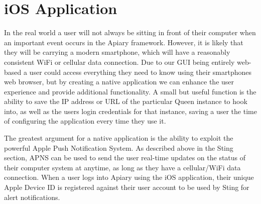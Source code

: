 \section{iOS Application}

In the real world a user will not always be sitting in front of their computer
when an important event occurs in the Apiary framework. However, it is likely
that they will be carrying a modern smartphone, which will have a reasonably
consistent WiFi or cellular data connection. Due to our GUI being entirely
web-based a user could access everything they need to know using their
smartphones web browser, but by creating a native application we can enhance the
user experience and provide additional functionality. A small but useful
function is the ability to save the IP address or URL of the particular Queen
instance to hook into, as well as the users login credentials for that instance,
saving a user the time of configuring the application every time they use it.

The greatest argument for a native application is the ability to exploit the
powerful Apple Push Notification System. As described above in the Sting
section, APNS can be used to send the user real-time updates on the status of
their computer system at anytime, as long as they have a cellular/WiFi data
connection. When a user logs into Apiary using the iOS application, their unique
Apple Device ID is registered against their user account to be used by Sting for
alert notifications.
